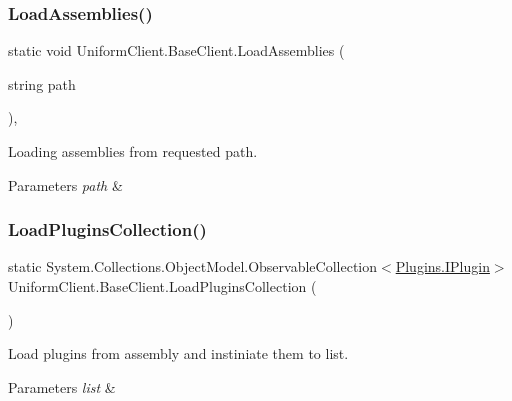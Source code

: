 \subsubsection{\texorpdfstring{Load\+Assemblies()}{LoadAssemblies()}}
{\footnotesize\ttfamily static void Uniform\+Client.\+Base\+Client.\+Load\+Assemblies (\begin{DoxyParamCaption}\item[{string}]{path }\end{DoxyParamCaption})\hspace{0.3cm}{\ttfamily [static]}, {\ttfamily [protected]}}



Loading assemblies from requested path. 


\begin{DoxyParams}{Parameters}
{\em path} & \\
\hline
\end{DoxyParams}
\mbox{\label{class_uniform_client_1_1_base_client_a99ae0bb1dd5bef374fcedb3f873bfe8b}} 
\subsubsection{\texorpdfstring{Load\+Plugins\+Collection()}{LoadPluginsCollection()}}
{\footnotesize\ttfamily static System.\+Collections.\+Object\+Model.\+Observable\+Collection$<$\mbox{\hyperlink{interface_uniform_client_1_1_plugins_1_1_i_plugin}{Plugins.\+I\+Plugin}}$>$ Uniform\+Client.\+Base\+Client.\+Load\+Plugins\+Collection (\begin{DoxyParamCaption}{ }\end{DoxyParamCaption})\hspace{0.3cm}{\ttfamily [static]}}



Load plugins from assembly and instiniate them to list. 


\begin{DoxyParams}{Parameters}
{\em list} & \\
\hline
\end{DoxyParams}
\mbox{\label{class_uniform_client_1_1_base_client_aa60dbfa5bd8c46659aec7738193315f1}} 
